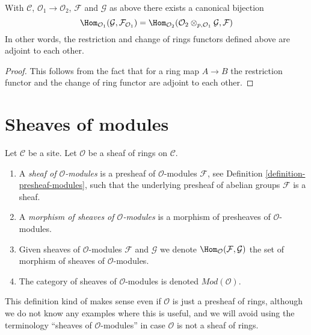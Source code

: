 \begin{lemma}
\label{lemma-adjointness-tensor-restrict-presheaves}
With $\mathcal{C}$, $\mathcal{O}_1 \to \mathcal{O}_2$, $\mathcal{F}$ and
$\mathcal{G}$ as above there exists a canonical bijection
$$
\Hom_{\mathcal{O}_1}(\mathcal{G}, \mathcal{F}_{\mathcal{O}_1})
=
\Hom_{\mathcal{O}_2}(
\mathcal{O}_2 \otimes_{p, \mathcal{O}_1} \mathcal{G},
\mathcal{F}
)
$$
In other words, the restriction and change of rings functors defined
above are adjoint to each other.
\end{lemma}

\begin{proof}
This follows from the fact that for a ring map
$A \to B$ the restriction functor and the change
of ring functor are adjoint to each other.
\end{proof}


\section{Sheaves of modules}
\label{section-sheaves-modules}

\begin{definition}
\label{definition-sheaf-modules}
Let $\mathcal{C}$ be a site.
Let $\mathcal{O}$ be a sheaf of rings on $\mathcal{C}$.
\begin{enumerate}
\item A {\it sheaf of $\mathcal{O}$-modules} is a presheaf
of $\mathcal{O}$-modules $\mathcal{F}$,
see Definition \ref{definition-presheaf-modules},
such that the underlying presheaf of abelian groups $\mathcal{F}$
is a sheaf.
\item A {\it morphism of sheaves of $\mathcal{O}$-modules}
is a morphism of presheaves of $\mathcal{O}$-modules.
\item Given sheaves of $\mathcal{O}$-modules
$\mathcal{F}$ and $\mathcal{G}$ we denote
$\Hom_\mathcal{O}(\mathcal{F}, \mathcal{G})$
the set of morphism of sheaves of $\mathcal{O}$-modules.
\item The category of sheaves of $\mathcal{O}$-modules
is denoted $\textit{Mod}(\mathcal{O})$.
\end{enumerate}
\end{definition}

\noindent
This definition kind of makes sense even if $\mathcal{O}$ is just a
presheaf of rings, although we do not know any examples where
this is useful, and we will avoid using the terminology
``sheaves of $\mathcal{O}$-modules''
in case $\mathcal{O}$ is not a sheaf of rings.



